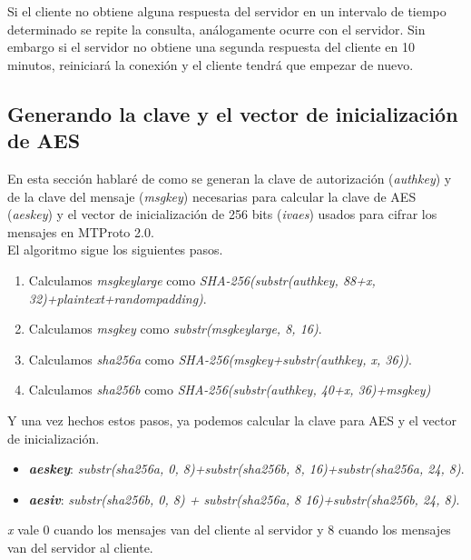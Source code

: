 Si el cliente no obtiene alguna respuesta del servidor en un intervalo de tiempo determinado se repite la consulta, análogamente ocurre con el servidor. Sin embargo si el servidor no obtiene una segunda respuesta del cliente en 10 minutos, reiniciará la conexión y el cliente tendrá que empezar de nuevo.

\subsection{Generando la clave y el vector de inicialización de AES}
En esta sección hablaré de como se generan la clave de autorización (\emph{auth\textunderscore key}) y de la clave del mensaje (\emph{msg\textunderscore key}) necesarias para calcular la clave de AES (\emph{aes\textunderscore key}) y el vector de inicialización de 256 bits (\emph{iv\textunderscore aes}) usados para cifrar los mensajes en MTProto 2.0.\\
El algoritmo sigue los siguientes pasos.
\begin{enumerate}
	\item Calculamos \emph{msg\textunderscore key\textunderscore large} como \emph{SHA-256(substr(auth\textunderscore key, 88+x, 32)+plaintext+random\textunderscore padding)}.
	\item Calculamos \emph{msg\textunderscore key} como \emph{substr(msg\textunderscore key\textunderscore large, 8, 16)}.
	\item Calculamos \emph{sha256\textunderscore a} como \emph{SHA-256(msg\textunderscore key+substr(auth\textunderscore key, x, 36))}.
	\item Calculamos \emph{sha256\textunderscore b} como \emph{SHA-256(substr(auth\textunderscore key, 40+x, 36)+msg\textunderscore key)}
\end{enumerate}
Y una vez hechos estos pasos, ya podemos calcular la clave para AES y el vector de inicialización.
\begin{itemize}
	\item \textbf{\emph{aes\textunderscore key}}: \emph{substr(sha256\textunderscore a, 0, 8)+substr(sha256\textunderscore b, 8, 16)+substr(sha256\textunderscore a, 24, 8)}.
	\item \textbf{\emph{aes\textunderscore iv}}: \emph{substr(sha256\textunderscore b, 0, 8) + substr(sha256\textunderscore a, 8 16)+substr(sha256\textunderscore b, 24, 8)}.
\end{itemize}
\emph{x} vale 0 cuando los mensajes van del cliente al servidor y 8 cuando los mensajes van del servidor al cliente.\\

